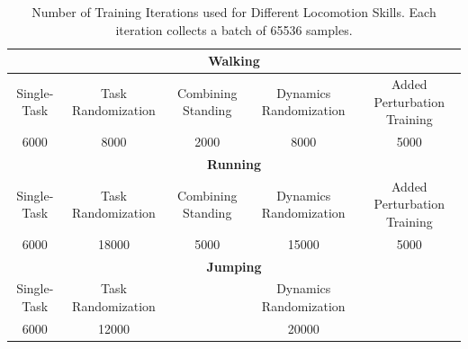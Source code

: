 \begin{table}[!]
\scriptsize
\centering
\caption{Number of Training Iterations used for Different Locomotion Skills. Each iteration collects a batch of 65536 samples.}
\label{tab:num_iter}
\begin{tabular}{|ccccc|}
\hline
\multicolumn{5}{|c|}{\textbf{Walking}} \\ \hline
\multicolumn{1}{|c|}{Single-Task} & \multicolumn{1}{c|}{Task Randomization} & \multicolumn{1}{c|}{Combining Standing} & \multicolumn{1}{c|}{Dynamics Randomization} & Added Perturbation Training \\ \hline
\multicolumn{1}{|c|}{6000} & \multicolumn{1}{c|}{8000} & \multicolumn{1}{c|}{2000} & \multicolumn{1}{c|}{8000} & 5000 \\ \hline
\multicolumn{5}{|c|}{\textbf{Running}} \\ \hline
\multicolumn{1}{|c|}{Single-Task} & \multicolumn{1}{c|}{Task Randomization} & \multicolumn{1}{c|}{Combining Standing} & \multicolumn{1}{c|}{Dynamics Randomization} & Added Perturbation Training \\ \hline
\multicolumn{1}{|c|}{6000} & \multicolumn{1}{c|}{18000} & \multicolumn{1}{c|}{5000} & \multicolumn{1}{c|}{15000} & 5000 \\ \hline
\multicolumn{5}{|c|}{\textbf{Jumping}} \\ \hline
\multicolumn{1}{|c|}{Single-Task} & \multicolumn{1}{c|}{Task Randomization} & \multicolumn{1}{c|}{} & \multicolumn{1}{c|}{Dynamics Randomization} &  \\ \hline
\multicolumn{1}{|c|}{6000} & \multicolumn{1}{c|}{12000} & \multicolumn{1}{c|}{} & \multicolumn{1}{c|}{20000} &  \\ \hline
\end{tabular}
\end{table}